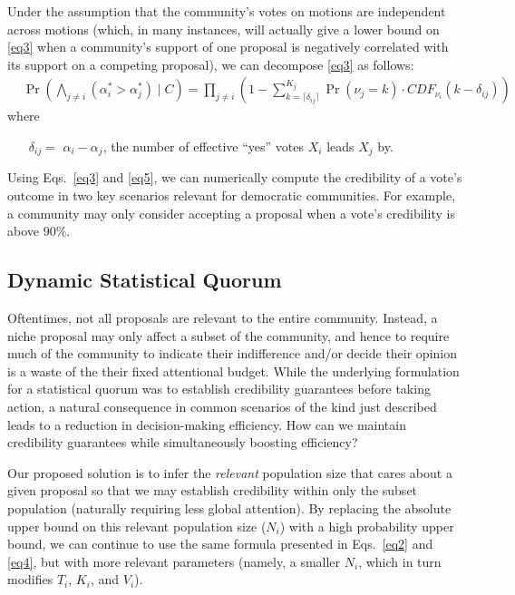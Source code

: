 \documentclass[format=acmsmall, review=true, screen=true, anonymous=true]{acmart}
\begin{document}
Under the assumption that the community's votes on motions are independent across motions (which, in many instances, will actually give a lower bound on \eqref{eq3} when a community's support of one proposal is negatively correlated with its support on a competing proposal), we can decompose \eqref{eq3} as follows:
\begin{align}\label{eq5}
& \Pr\left(\bigwedge_{j \neq i} (\alpha^*_i > \alpha^*_j) \mid C\right) = \prod_{j \neq i}\left(1 - \sum_{k=\lceil\delta_{ij}\rceil}^{K_j} \Pr(\nu_j = k) \cdot {CDF}_{\nu_i}(k-\delta_{ij}) \right)
\end{align}
where
\begin{itemize}
\item[$\delta_{ij} = $] $\alpha_i - \alpha_j$, the number of effective ``yes'' votes $X_i$ leads $X_j$ by.
\end{itemize}

Using Eqs.~\eqref{eq3} and \eqref{eq5}, we can numerically compute the credibility of a vote's outcome in two key scenarios relevant for democratic communities.  For example, a community may only consider accepting a proposal when a vote's credibility is above $90\%$.

\subsection{Dynamic Statistical Quorum}
Oftentimes, not all proposals are relevant to the entire community.  Instead, a niche proposal may only affect a subset of the community, and hence to require much of the community to indicate their indifference and/or decide their opinion is a waste of the their fixed attentional budget.  While the underlying formulation for a statistical quorum was to establish credibility guarantees before taking action, a natural consequence in common scenarios of the kind just described leads to a reduction in decision-making efficiency.  How can we maintain credibility guarantees while simultaneously boosting efficiency?

Our proposed solution is to infer the \textit{relevant} population size that cares about a given proposal so that we may establish credibility within only the subset population (naturally requiring less global attention).  By replacing the absolute upper bound on this relevant population size ($N_i$) with a high probability upper bound, we can continue to use the same formula presented in Eqs.~\eqref{eq2} and \eqref{eq4}, but with more relevant parameters (namely, a smaller $N_i$, which in turn modifies $T_i$, $K_i$, and $V_i$).
\end{document}

